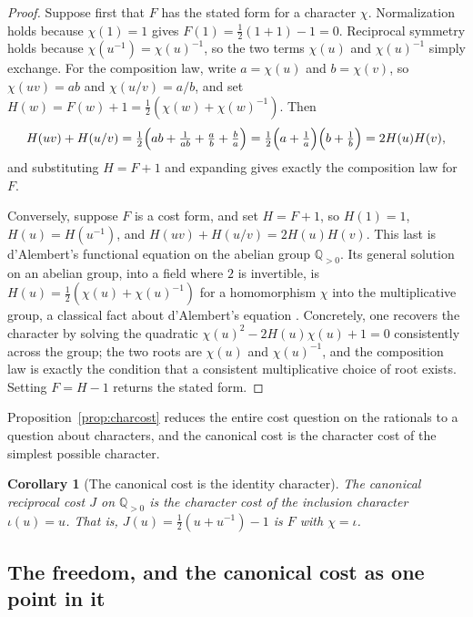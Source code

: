 \documentclass[11pt,a4paper]{article}
\newtheorem{corollary}[theorem]{Corollary}
\theoremstyle{definition}
\theoremstyle{remark}
\newcommand{\Qpos}{\mathbb{Q}_{>0}}
\begin{document}
\begin{proof}
Suppose first that $F$ has the stated form for a character $\chi$. Normalization
holds because $\chi(1) = 1$ gives $F(1) = \tfrac{1}{2}(1 + 1) - 1 = 0$.
Reciprocal symmetry holds because $\chi(u^{-1}) = \chi(u)^{-1}$, so the two terms
$\chi(u)$ and $\chi(u)^{-1}$ simply exchange. For the composition law, write
$a = \chi(u)$ and $b = \chi(v)$, so $\chi(uv) = ab$ and $\chi(u/v) = a/b$, and
set $H(w) = F(w) + 1 = \tfrac{1}{2}(\chi(w) + \chi(w)^{-1})$. Then
\[
  H(uv) + H(u/v)
  = \tfrac{1}{2}\Bigl(ab + \tfrac{1}{ab} + \tfrac{a}{b} + \tfrac{b}{a}\Bigr)
  = \tfrac{1}{2}\Bigl(a + \tfrac{1}{a}\Bigr)\Bigl(b + \tfrac{1}{b}\Bigr)
  = 2 H(u) H(v) ,
\]
and substituting $H = F + 1$ and expanding gives exactly the composition law for
$F$.

Conversely, suppose $F$ is a cost form, and set $H = F + 1$, so $H(1) = 1$,
$H(u) = H(u^{-1})$, and $H(uv) + H(u/v) = 2H(u)H(v)$. This last is d'Alembert's
functional equation on the abelian group $\Qpos$. Its general solution on an
abelian group, into a field where $2$ is invertible, is
$H(u) = \tfrac{1}{2}(\chi(u) + \chi(u)^{-1})$ for a homomorphism $\chi$ into the
multiplicative group, a classical fact about d'Alembert's equation
\cite{Aczel1966}. Concretely, one recovers the character by solving the quadratic
$\chi(u)^2 - 2H(u)\chi(u) + 1 = 0$ consistently across the group; the two roots
are $\chi(u)$ and $\chi(u)^{-1}$, and the composition law is exactly the
condition that a consistent multiplicative choice of root exists. Setting
$F = H - 1$ returns the stated form.
\end{proof}

Proposition~\ref{prop:charcost} reduces the entire cost question on the rationals
to a question about characters, and the canonical cost is the character cost of
the simplest possible character.

\begin{corollary}[The canonical cost is the identity character]\label{cor:Jchar}
The canonical reciprocal cost $J$ on $\Qpos$ is the character cost of the
inclusion character $\iota(u) = u$. That is, $J(u) = \tfrac{1}{2}(u + u^{-1}) - 1$
is $F$ with $\chi = \iota$.
\end{corollary}

\subsection{The freedom, and the canonical cost as one point in it}
\end{document}
